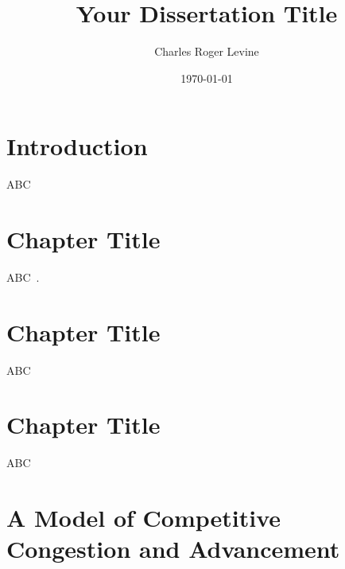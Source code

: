 \documentclass[12pt]{report}
\title{Your Dissertation Title}
\author{Charles Roger Levine}
\date{\today}
\begin{document}
 

\maketitle


\setcounter{page}{2}
\makeacknowledgement
\makeabstract


{}
\tableofcontents
\clearpage 

 {}
\listoffigures 
\clearpage


\begin{mainf}







\clearpage


\chapter*{Introduction}
\setcounter{chapter}{0}

ABC

\clearpage



\chapter{Chapter Title}

ABC~\cite{ishibe2006cell}.

\clearpage



\chapter{Chapter Title}

ABC

\clearpage



\chapter{Chapter Title}

ABC

\clearpage



\chapter{A Model of Competitive Congestion and Advancement}
\label{chap:competitive-congestion}



\end{mainf}
\end{document}
